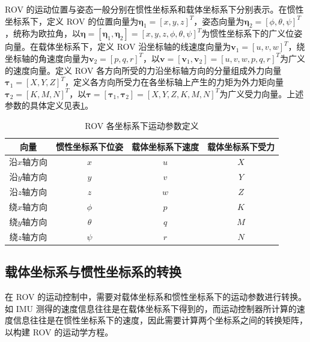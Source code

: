 ROV 的运动位置与姿态一般分别在惯性坐标系和载体坐标系下分别表示。在惯性坐标系下，定义 ROV 的位置向量为$\symbf{\eta}_1 = [x,y,z]^T$，姿态向量为$\symbf{\eta}_2 = [\phi, \theta, \psi]^T$，统称为欧拉角，以$\symbf{\eta} = [\symbf{\eta}_1, \symbf{\eta}_2]=[x,y,z,\phi,\theta,\psi]^T$为惯性坐标系下的广义位姿向量。在载体坐标系下，定义 ROV 沿坐标轴的线速度向量为$\symbf{v}_1 = [u,v,w]^T$，绕坐标轴的角速度向量为$\symbf{v}_2=[p,q,r]^T$，以$\symbf{v} = [\symbf{v}_1,\symbf{v}_2] = [u,v,w,p,q,r]^T$为广义的速度向量。定义 ROV 各方向所受的力沿坐标轴方向的分量组成外力向量$\symbf{\tau}_1=[X, Y, Z]^T$，定义各方向所受力在各坐标轴上产生的力矩为外力矩向量$\symbf{\tau}_2 = [K, M, N]^T$，以$\symbf{\tau}=[\symbf{\tau}_1,\symbf{\tau}_2]=[X, Y, Z ,K, M ,N]^T$为广义受力向量。上述参数的具体定义见表\ref{t.kinetics_params}。

\begin{table}[htb]
  \centering
  \caption{ROV 各坐标系下运动参数定义}
  
  \label{t.kinetics_params}
  \begin{tabular}{cccc}
  \hline
向量 & 惯性坐标系下位姿  & 载体坐标系下速度 & 载体坐标系下受力 \\
\hline
沿$x$轴方向 & $x$  & $u$ & $X$ \\
沿$y$轴方向 & $y$  & $v$ & $Y$ \\
沿$z$轴方向 & $z$  & $w$ & $Z$ \\
绕$x$轴方向 & $\phi$  & $p$ & $K$ \\
绕$y$轴方向 & $\theta$  & $q$ & $M$ \\
绕$z$轴方向 & $\psi$  & $r$ & $N$ \\
\hline
\end{tabular}
\end{table}

\subsection{载体坐标系与惯性坐标系的转换}

在 ROV 的运动控制中，需要对载体坐标系和惯性坐标系下的运动参数进行转换。如 IMU 测得的速度信息往往是在载体坐标系下得到的，而运动控制器所计算的速度信息往往是在惯性坐标系下的速度，因此需要计算两个坐标系之间的转换矩阵，以构建 ROV 的运动学方程。


